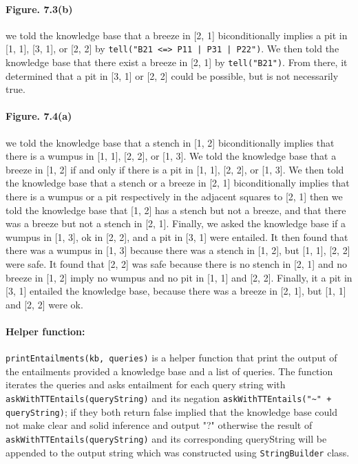 \documentclass[a4paper]{report}
\begin{document}
\paragraph{Figure. 7.3(b) } we told the knowledge base that a breeze in [2, 1] biconditionally implies a pit in [1, 1], [3, 1], or [2, 2] by \texttt{tell("B21 <=> P11 | P31 | P22")}. We then told the knowledge base that there exist a breeze in [2, 1] by \texttt{tell("B21")}. From there, it determined that a pit in [3, 1] or [2, 2] could be possible, but is not necessarily true. \\

\paragraph{Figure. 7.4(a) } we told the knowledge base that a stench in [1, 2] biconditionally implies that there is a wumpus in [1, 1], [2, 2], or [1, 3]. We told the knowledge base that a breeze in [1, 2] if and only if there is a pit in [1, 1], [2, 2], or [1, 3]. We then told the knowledge base that a stench or a breeze in [2, 1] biconditionally implies that there is a wumpus or a pit respectively in the adjacent squares to [2, 1] then we told the knowledge base that [1, 2] has a stench but not a breeze, and that there was a breeze but not a stench in [2, 1]. Finally, we asked the knowledge base if a wumpus in [1, 3], ok in [2, 2], and a pit in [3, 1] were entailed. It then found that there was a wumpus in [1, 3] because there was a stench in [1, 2], but [1, 1], [2, 2] were safe. It found that [2, 2] was safe because there is no stench in [2, 1] and no breeze in [1, 2] imply no wumpus and no pit in [1, 1] and [2, 2]. Finally, it a pit in [3, 1] entailed the knowledge base, because there was a breeze in [2, 1], but [1, 1] and [2, 2] were ok. \\

\paragraph{Helper function: } \texttt{printEntailments(kb, queries)} is a helper function that print the output of the entailments provided a knowledge base and a list of queries. The function iterates the queries and asks entailment for each query string with \texttt{askWithTTEntails(queryString)} and its negation \texttt{askWithTTEntails("\textasciitilde{}" + queryString)}; if they both return false implied that the knowledge base could not make clear and solid inference and output "?" otherwise the result of \texttt{askWithTTEntails(queryString)} and its corresponding queryString will be appended to the output string which was constructed using \texttt{StringBuilder} class.
\end{document}
